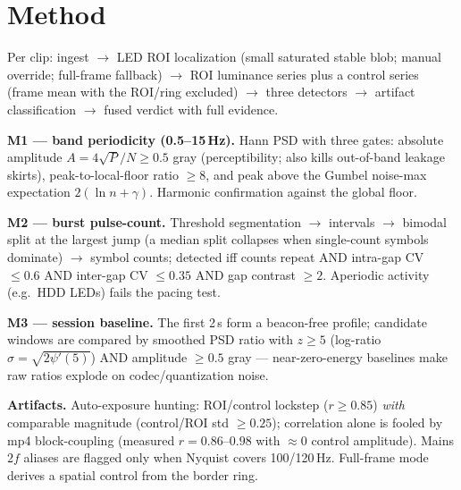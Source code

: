 \documentclass[10pt]{article}
\begin{document}
\section{Method}\label{sec:method}
Per clip: ingest $\rightarrow$ LED ROI localization (small saturated stable
blob; manual override; full-frame fallback) $\rightarrow$ ROI luminance series
plus a control series (frame mean with the ROI/ring excluded) $\rightarrow$
three detectors $\rightarrow$ artifact classification $\rightarrow$ fused
verdict with full evidence.

\textbf{M1 --- band periodicity (0.5--15\,Hz).} Hann PSD with three gates:
absolute amplitude $A = 4\sqrt{P}/N \ge 0.5$ gray (perceptibility; also kills
out-of-band leakage skirts), peak-to-local-floor ratio $\ge 8$, and peak above
the Gumbel noise-max expectation $2(\ln n + \gamma)$. Harmonic confirmation
against the global floor.

\textbf{M2 --- burst pulse-count.} Threshold segmentation $\rightarrow$
intervals $\rightarrow$ bimodal split at the largest jump (a median split
collapses when single-count symbols dominate) $\rightarrow$ symbol counts;
detected iff counts repeat AND intra-gap CV $\le 0.6$ AND inter-gap CV
$\le 0.35$ AND gap contrast $\ge 2$. Aperiodic activity (e.g.\ HDD LEDs)
fails the pacing test.

\textbf{M3 --- session baseline.} The first 2\,s form a beacon-free profile;
candidate windows are compared by smoothed PSD ratio with
$z \ge 5$ (log-ratio $\sigma=\sqrt{2\psi'(5)}$) AND amplitude
$\ge 0.5$ gray --- near-zero-energy baselines make raw ratios explode on
codec/quantization noise.

\textbf{Artifacts.} Auto-exposure hunting: ROI/control lockstep
($r \ge 0.85$) \emph{with} comparable magnitude (control/ROI std $\ge 0.25$);
correlation alone is fooled by mp4 block-coupling (measured
$r = 0.86$--$0.98$ with $\approx 0$ control amplitude). Mains $2f$ aliases are
flagged only when Nyquist covers 100/120\,Hz. Full-frame mode derives a spatial
control from the border ring.
\end{document}
